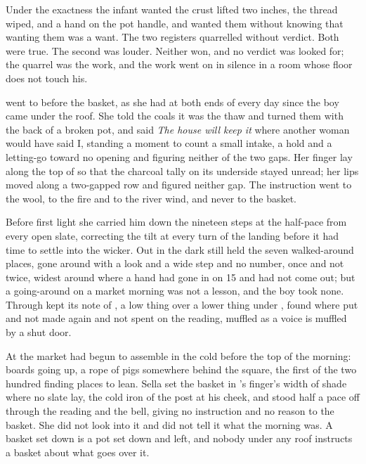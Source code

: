 Under the exactness the infant wanted the crust lifted two inches, the thread wiped, and a hand on the pot handle, and wanted them without knowing that wanting them was a want. The two registers quarrelled without verdict. Both were true. The second was louder. Neither won, and no verdict was looked for; the quarrel was the work, and the work went on in silence in a room whose floor does not touch his.

 went to  before the basket, as she had at both ends of every day since the boy came under the roof. She told the coals it was the thaw and turned them with the back of a broken pot, and said \emph{The house will keep it} where another woman would have said I, standing a moment to count a small intake, a hold and a letting-go toward no opening and figuring neither of the two gaps. Her finger lay along the top of  so that the charcoal tally on its underside stayed unread; her lips moved along a two-gapped row and figured neither gap. The instruction went to the wool, to the fire and to the river wind, and never to the basket.

Before first light she carried him down the nineteen steps at the half-pace from every open slate, correcting the tilt at every turn of the landing before it had time to settle into the wicker. Out in  the dark still held the seven walked-around places, gone around with a look and a wide step and no number, once and not twice, widest around  where a hand had gone in on  15 and had not come out; but a going-around on a market morning was not a lesson, and the boy took none. Through   kept its note of , a low thing over a lower thing under , found where put and not made again and not spent on the reading, muffled as a voice is muffled by a shut door.

At  the market had begun to assemble in the cold before the top of the morning: boards going up, a rope of pigs somewhere behind the square, the first of the two hundred finding places to lean. Sella set the basket in 's finger's width of shade where no slate lay, the cold iron of the post at his cheek, and stood half a pace off through the reading and the bell, giving no instruction and no reason to the basket. She did not look into it and did not tell it what the morning was. A basket set down is a pot set down and left, and nobody under any roof instructs a basket about what goes over it.

